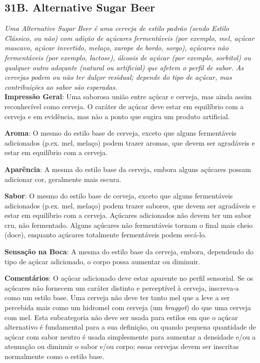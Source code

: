 \subsection*{31B. Alternative Sugar Beer}
\textit{Uma Alternative Sugar Beer é uma cerveja de estilo padrão (sendo Estilo Clássico, ou não) com adição de açúcares fermentáveis (por exemplo, mel, açúcar mascavo, açúcar invertido, melaço, xarope de bordo, sorgo), açúcares não fermentáveis (por exemplo, lactose), álcoois de açúcar (por exemplo, sorbitol) ou qualquer outro adoçante (natural ou artificial) que afetem o perfil de sabor. As cervejas podem ou não ter dulçor residual; depende do tipo de açúcar, mas contribuições ao sabor são esperadas.}\\
\textbf{Impressão Geral}: Uma saborosa união entre açúcar e cerveja, mas ainda assim reconhecível como cerveja. O caráter de açúcar deve estar em equilíbrio com a cerveja e em evidência, mas não a ponto que sugira um produto artificial.

\textbf{Aroma}: O mesmo do estilo base de cerveja, exceto que alguns fermentáveis adicionados (p.ex. mel, melaço) podem trazer aromas, que devem ser agradáveis e estar em equilíbrio com a cerveja.

\textbf{Aparência}: A mesma do estilo base da cerveja, embora alguns açúcares possam adicionar cor, geralmente mais escura.

\textbf{Sabor}: O mesmo do estilo base de cerveja, exceto que alguns fermentáveis adicionados (p.ex. mel, melaço) podem trazer sabores, que devem ser agradáveis e estar em equilíbrio com a cerveja. Açúcares adicionados não devem ter um sabor cru, não fermentado. Alguns açúcares não fermentáveis tornam o final mais cheio (doce), enquanto açúcares totalmente fermentáveis podem secá-lo.

\textbf{Sensação na Boca}: A mesma do estilo base da cerveja, embora, dependendo do tipo de açúcar adicionado, o corpo possa aumentar ou diminuir.

\textbf{Comentários}: O açúcar adicionado deve estar aparente no perfil sensorial. Se os açúcares não fornecem um caráter distinto e perceptível à cerveja, inscreva-a como um estilo base. Uma cerveja não deve ter tanto mel que a leve a ser percebida mais como um hidromel com cerveja (um \textit{braggot}) do que uma cerveja com mel. Esta subcategoria não deve ser usada para estilos em que o açúcar alternativo é fundamental para a sua definição, ou quando pequena quantidade de açúcar com sabor neutro é usada simplesmente para aumentar a densidade e/ou a atenuação ou diminuir o sabor e/ou corpo; essas cervejas devem ser inscritas normalmente como o estilo base.

